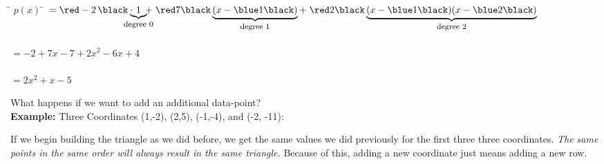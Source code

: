 \documentclass[a4paper,12pt,]{report}
\begin{document}
\begin{tabbing}
	\hspace{3.3cm} \= $p(x)$ \hspace{1mm} \=  $= \red -2 \, \black \cdot \!\!\!\!\!\!\!
	\underbrace{1}_{\text{\footnotesize{degree 0}}} \!\!\!\!\!\!
	+ \; \red 7 \black \underbrace{(x-\blue 1 \black)} _{\text{\footnotesize{degree 1}}}
	+ \; \red 2 \black \underbrace{(x-\blue 1 \black)(x-\blue 2 \black)}_{\text{\footnotesize{degree 2}}}$\\ \\

	\>\>$= -2 + 7x - 7 + 2x^2 - 6x + 4$\\ \\

	\>\>$= 2x^2 + x -5$\\
\end{tabbing}

	What happens if we want to add an additional data-point?\\

	\noindent \textbf{Example:} Three Coordinates (1,-2), (2,5), (-1,-4), and (-2, -11):

\begin{center}
\end{center}

	\noindent If we begin building the triangle as we did before, we get the same values we did previously for the first three
	three coordinates. \textit{The same points in the same order will always result in the same triangle.}  Because of this,
	adding a new coordinate just means adding a new row.
\end{document}
